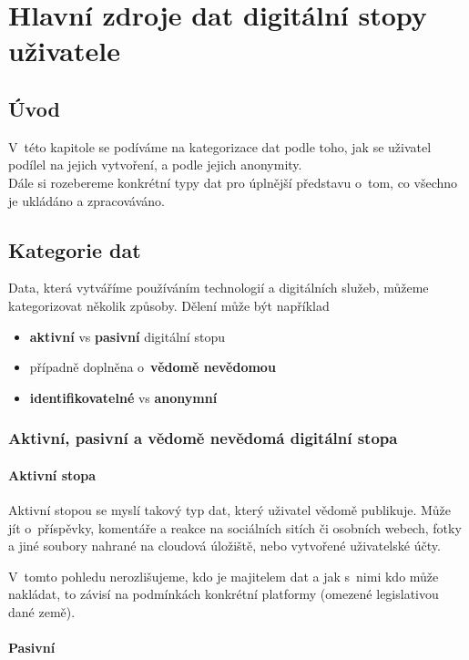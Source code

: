 \chapter{Hlavní zdroje dat digitální stopy uživatele}

\section{Úvod}
V~této kapitole se podíváme na kategorizace dat podle toho, jak se uživatel podílel na jejich vytvoření, a podle jejich anonymity.\\
Dále si rozebereme konkrétní typy dat pro úplnější představu o~tom, co všechno je ukládáno a zpracováváno.\\   

\section{Kategorie dat}
Data, která vytváříme používáním technologií a digitálních služeb, můžeme kategorizovat několik způsoby. Dělení může být například
\begin{itemize}
	\item \textbf{aktivní} vs \textbf{pasivní} digitální stopu \citep{pew-digital-footprint}
    \item případně doplněna o~\textbf{vědomě nevědomou} \citep{fish-digital-footprint}
\item \textbf{identifikovatelné} vs \textbf{anonymní}
\end{itemize}


\subsection{Aktivní, pasivní a vědomě nevědomá digitální stopa}
\subsubsection{Aktivní stopa}
Aktivní stopou se myslí takový typ dat, který uživatel vědomě publikuje. Může jít o~příspěvky, komentáře a reakce na sociálních sitích či osobních webech, fotky a jiné soubory nahrané na cloudová úložiště, nebo vytvořené uživatelské účty.\citep{pew-digital-footprint}

V~tomto pohledu nerozlišujeme, kdo je majitelem dat a jak s~nimi kdo může nakládat, to závisí na podmínkách konkrétní platformy (omezené legislativou dané země).

\subsubsection{Pasivní}

